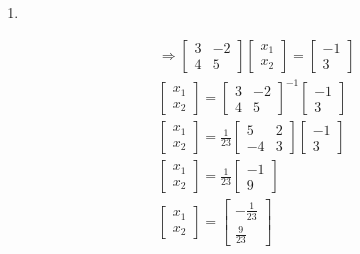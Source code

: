 \documentclass[
  letterpaper,
  DIV=11,
  numbers=noendperiod]{scrartcl}
\begin{document}
\begin{enumerate}
\def\labelenumi{\arabic{enumi})}
\item
\end{enumerate}

\begin{align*}
&\Rightarrow \begin{bmatrix}3 & -2 \\ 4 & 5\end{bmatrix}\begin{bmatrix}x_1 \\ x_2\end{bmatrix}=\begin{bmatrix}-1 \\ 3\end{bmatrix} \\
& \begin{bmatrix}x_1 \\ x_2\end{bmatrix}=\begin{bmatrix}3 & -2 \\ 4 & 5\end{bmatrix}^{-1}\begin{bmatrix}-1 \\ 3\end{bmatrix} \\
& \begin{bmatrix}x_1 \\ x_2\end{bmatrix}=\frac{1}{23}\begin{bmatrix}5 & 2 \\ -4 & 3\end{bmatrix}\begin{bmatrix}-1 \\ 3\end{bmatrix} \\
& \begin{bmatrix}x_1 \\ x_2\end{bmatrix}=\frac{1}{23}\begin{bmatrix}-1 \\ 9\end{bmatrix} \\
& \begin{bmatrix}x_1 \\ x_2\end{bmatrix}=\begin{bmatrix}-\frac{1}{23} \\ \frac{9}{23}\end{bmatrix}
\end{align*}
\end{document}
